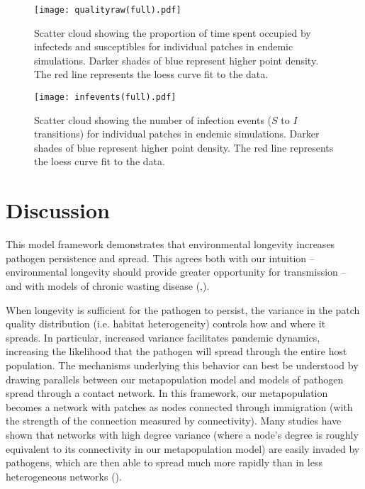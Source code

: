 \documentclass{svjour3}
\begin{document}
\begin{figure}
\label{qualityraw}
\centering
\texttt{[image: qualityraw(full).pdf]}
\caption{Scatter cloud showing the proportion of time spent occupied by infecteds and susceptibles for individual patches in endemic simulations. Darker shades of blue represent higher point density. The red line represents the loess curve fit to the data.}
\end{figure}

\begin{figure}
\label{infections}
\centering
\texttt{[image: infevents(full).pdf]}
\caption{Scatter cloud showing the number of infection events ($S$ to $I$ transitions) for individual patches in endemic simulations. Darker shades of blue represent higher point density. The red line represents the loess curve fit to the data.}
\end{figure}

\section{Discussion}
\label{discussion}

This model framework demonstrates that environmental longevity increases pathogen persistence and spread.  This agrees both with our intuition -- environmental longevity should provide greater opportunity for transmission -- and with models of chronic wasting disease (\cite{Almberg2011},\cite{Sharp2011}).  

When longevity is sufficient for the pathogen to persist, the variance in the patch quality distribution (i.e. habitat heterogeneity) controls how and where it spreads.  In particular, increased variance facilitates pandemic dynamics, increasing the likelihood that the pathogen will spread through the entire host population.  The mechanisms underlying this behavior can best be understood by drawing parallels between our metapopulation model and models of pathogen spread through a contact network.  In this framework, our metapopulation becomes a network with patches as nodes connected through immigration (with the strength of the connection measured by connectivity).  Many studies have shown that networks with high degree variance (where a node's degree is roughly equivalent to its connectivity in our metapopulation model) are easily invaded by pathogens, which are then able to spread much more rapidly than in less heterogeneous networks (\cite{Pastor-Satorras2001}).
\end{document}
